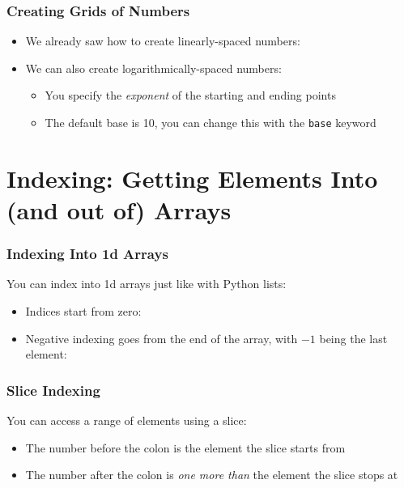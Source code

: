\documentclass[xcolor={x11names,table}]{beamer}
\begin{document}
\begin{frame}
	\frametitle{Creating Grids of Numbers}
	\begin{itemize}
		\item We already saw how to create linearly-spaced numbers:
		
		\item We can also create logarithmically-spaced numbers:
		
		\begin{itemize}
			\item You specify the \emph{exponent} of the starting and ending points
			\item The default base is 10, you can change this with the \texttt{base} keyword
		\end{itemize}
	\end{itemize}
\end{frame}

\section{Indexing: Getting Elements Into (and out of) Arrays}

\begin{frame}
	\frametitle{Indexing Into 1d Arrays}
	You can index into 1d arrays just like with Python lists:
	
	\begin{itemize}
		\item Indices start from zero:
		
		\item Negative indexing goes from the end of the array, with $-1$ being the last element:
		
	\end{itemize}
\end{frame}

\begin{frame}
	\frametitle{Slice Indexing}
	
	You can access a range of elements using a slice:
	
	\begin{itemize}
		\item The number before the colon is the element the slice starts from
		\item The number after the colon is \emph{one more than} the element the slice stops at
	\end{itemize}
\end{frame}
\end{document}
